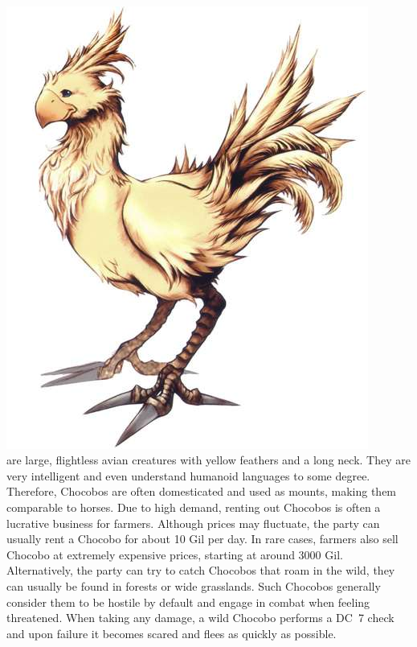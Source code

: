 %

\\
%
\includegraphics[width=0.95\columnwidth]{./art/chocobo/chocobo.jpg}
%
\\
%
%
 are large, flightless avian creatures with yellow feathers and a long neck.
They are very intelligent and even understand humanoid languages to some degree.
Therefore, Chocobos are often domesticated and used as mounts, making them comparable to horses.
Due to high demand, renting out Chocobos is often a lucrative business for farmers.
Although prices may fluctuate, the party can usually rent a Chocobo for about 10 Gil per day.
In rare cases, farmers also sell Chocobo at extremely expensive prices, starting at around 3000 Gil. 
Alternatively, the party can try to catch Chocobos that roam in the wild, they can usually be found in forests or wide grasslands.
Such Chocobos generally consider them to be hostile by default and engage in combat when feeling threatened.
When taking any damage, a wild Chocobo performs a DC~7 check and upon failure it becomes scared and flees as quickly as possible.
